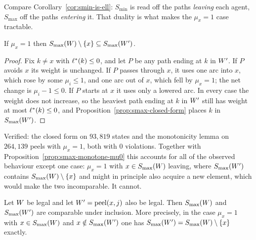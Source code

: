 Compare Corollary~\ref{cor:smin-is-ell}: $S_{\min}$ is read off the paths
\emph{leaving} each agent, $S_{\max}$ off the paths \emph{entering} it. That
duality is what makes the $\mu_x = 1$ case tractable.

\begin{lemma}
\label{lem:smax-mono-mu1}
If $\mu_x = 1$ then $S_{\max}(W) \setminus \left\{x\right\} \subseteq
S_{\max}(W')$.
\end{lemma}

\begin{proof}
Fix $k \ne x$ with $\ell^{\ast}(k) \le 0$, and let $P$ be any path ending at $k$ in
$W'$. If $P$ avoids $x$ its weight is unchanged. If $P$ passes through
$x$, it uses one arc into $x$, which rose by some $\mu_i \le 1$, and one arc out
of $x$, which fell by $\mu_x = 1$; the net change is $\mu_i - 1 \le 0$. If $P$
starts at $x$ it uses only a lowered arc. In every case the weight does not
increase, so the heaviest path ending at $k$ in $W'$ still has weight
at most $\ell^{\ast}(k) \le 0$, and
Proposition~\ref{prop:smax-closed-form} places $k$ in $S_{\max}(W')$.
\end{proof}

Verified: the closed form on $93{,}819$ states and the monotonicity lemma on
$264{,}139$ peels with $\mu_x = 1$, both with $0$ violations. Together with
Proposition~\ref{prop:smax-monotone-mu0} this accounts for all of the observed
behaviour except one case: $\mu_x = 1$ with $x \in S_{\max}(W)$
leaving, where $S_{\max}(W')$ contains
$S_{\max}(W) \setminus \left\{x\right\}$ and might in principle also acquire a
new element, which would make the two incomparable. It cannot.

\begin{theorem}
\label{obs:smax-comparable}
Let $W$ be legal and let $W' = \mathrm{peel}(x,j)$ also be
legal. Then $S_{\max}(W)$ and $S_{\max}(W')$ are comparable
under inclusion. More precisely, in the case $\mu_x = 1$ with
$x \in S_{\max}(W)$ and $x \notin S_{\max}(W')$ one has
$S_{\max}(W') = S_{\max}(W) \setminus \left\{x\right\}$ exactly.
\end{theorem}

